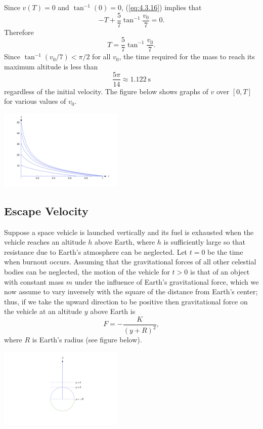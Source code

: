\documentclass{ximera}
\begin{document}
\begin{example}
\begin{explanation}
 Since $v(T)=0$ and $\tan^{-1}(0)=0$, (\ref{eq:4.3.16}) implies that
$$
-T+\frac{5}{7} \tan^{-1}\frac{v_0}{7}=0.
$$
Therefore
$$
T=\frac{5}{7} \tan^{-1}\frac{v_0}{7}.
$$
Since $\tan^{-1}(v_0/7)<\pi/2$ for all $v_0$,
the  time required for the mass to reach its maximum
altitude is less than
$$
\frac{5\pi}{14} \approx 1.122\  \mbox{s}
$$
regardless of the initial velocity.  The figure below
shows graphs of $v$ over $[0,T]$ for various values of $v_0$.
 
\begin{image}
  \includegraphics[height=1.5in]{fig040304.jpg}
\end{image}
\end{explanation}
\end{example}
 
\subsection*{Escape Velocity}
 
Suppose a space vehicle is launched vertically and its fuel is
exhausted when the vehicle reaches an altitude $h$ above Earth, where
$h$ is sufficiently large so that resistance due to Earth's atmosphere
can be neglected. Let $t=0$ be the time when burnout occurs.
Assuming that the gravitational forces of all other celestial bodies
can be neglected, the motion of the vehicle for $t > 0$ is that of an
object with constant mass $m$ under the influence of Earth's
gravitational force, which we now assume to vary inversely with the
square of the distance from Earth's center;  thus, if we take the
upward direction to be positive then
gravitational force on the vehicle at an altitude $y$ above Earth is
\begin{equation} \label{eq:4.3.18}
F=-\frac{K}{(y+R)^2},
\end{equation}
where $R$ is  Earth's radius (see figure below).
 
\begin{image}
  \includegraphics[height=1.5in]{fig040305.jpg}
\end{image}
 
\end{document}
